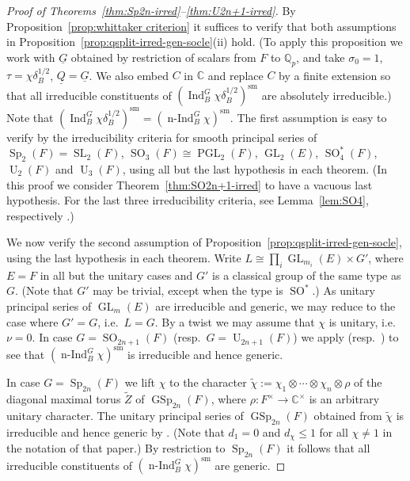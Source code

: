 \documentclass[a4paper]{amsart}
\numberwithin{equation}{section}
\theoremstyle{remark}
\theoremstyle{definition}
\DeclareMathOperator{\Ind}{Ind}
\DeclareMathOperator{\nInd}{n-Ind}
\newcommand{\C}{\mathbb{C}}
\newcommand{\Q}{\mathbb{Q}}
\DeclareMathOperator{\SL}{SL}
\DeclareMathOperator{\U}{U}
\DeclareMathOperator{\Sp}{Sp}
\DeclareMathOperator{\GSp}{GSp}
\DeclareMathOperator{\SO}{SO}
\DeclareMathOperator{\GL}{GL}
\DeclareMathOperator{\PGL}{PGL}
\newcommand{\sm}{\mathrm{sm}}
\newcommand{\alggrp}[1]{\underline{#1}}
\newcommand{\wt}[1]{\widetilde{#1}}
\begin{document}
\begin{proof}[Proof of Theorems~\ref{thm:Sp2n-irred}--\ref{thm:U2n+1-irred}]
  By Proposition~\ref{prop:whittaker criterion} it suffices to verify that both assumptions in Proposition~\ref{prop:qsplit-irred-gen-socle}(ii) hold.
  (To apply this proposition we work with $\alggrp G$ obtained by restriction of scalars from $F$ to $\Q_p$, and take $\sigma_0 = 1$, $\tau = \chi\delta_B^{1/2}$, $\alggrp{Q} = \alggrp{G}$.
  We also embed $C$ in $\C$ and replace $C$ by a finite extension so that all irreducible constituents of $(\Ind_{B}^{G}\chi\delta_B^{1/2})^{\sm}$ are absolutely irreducible.)
  Note that $(\Ind_{B}^{G}\chi\delta_B^{1/2})^{\sm} = (\nInd_{B}^{G}\chi)^{\sm}$.
  The first assumption is easy to verify by the irreducibility criteria for smooth principal series of $\Sp_2(F) = \SL_2(F)$, $\SO_3(F) \cong \PGL_2(F)$, $\GL_2(E)$, $\SO^*_4(F)$, $\U_2(F)$ and $\U_3(F)$,
  using all but the last hypothesis in each theorem.
  (In this proof we consider Theorem~\ref{thm:SO2n+1-irred} to have a vacuous last hypothesis.
  For the last three irreducibility criteria, see Lemma~\ref{lem:SO4}, respectively \cite[\S11.1, \S12.2]{MR1081540}.)
  
  We now verify the second assumption of Proposition~\ref{prop:qsplit-irred-gen-socle}, using the last hypothesis in each theorem.
  Write $L \cong \prod_i \GL_{m_i}(E) \times G'$, where $E = F$ in all but the unitary cases and $G'$ is a classical group of the same type as $G$.
  (Note that $G'$ may be trivial, except when the type is $\SO^*$.)
  As unitary principal series of $\GL_m(E)$ are irreducible and generic, we may reduce to the case where $G' = G$, i.e.\ $L = G$.
  By a twist we may assume that $\chi$ is unitary, i.e.\ $\nu = 0$.
  In case $G = \SO_{2n+1}(F)$   (resp.\ $G = \U_{2n+1}(F)$) we apply \cite[Theorem 6.5(1)]{MR1296726}   (resp.\ \cite[Theorem 3.4]{MR1224616}) to see that $(\nInd_{B}^{G}\chi)^{\sm}$ is irreducible and hence generic.

  In case $G = \Sp_{2n}(F)$ we lift $\chi$ to the character $\wt\chi := \chi_1 \otimes \cdots \otimes \chi_n \otimes \rho$ of the diagonal maximal torus $\wt Z$ of $\GSp_{2n}(F)$, where $\rho : F^\times \to \C^\times$ is an arbitrary unitary character. 
  The unitary principal series of $\GSp_{2n}(F)$ obtained from $\wt\chi$ is irreducible and hence generic by \cite[Theorem 2.6]{MR1464132}.
  (Note that $d_1 = 0$ and $d_\chi \le 1$ for all $\chi \ne 1$ in the notation of that paper.)
  By restriction to $\Sp_{2n}(F)$ it follows that all irreducible constituents of $(\nInd_{B}^{G}\chi)^{\sm}$ are generic.


\end{proof}
\end{document}

